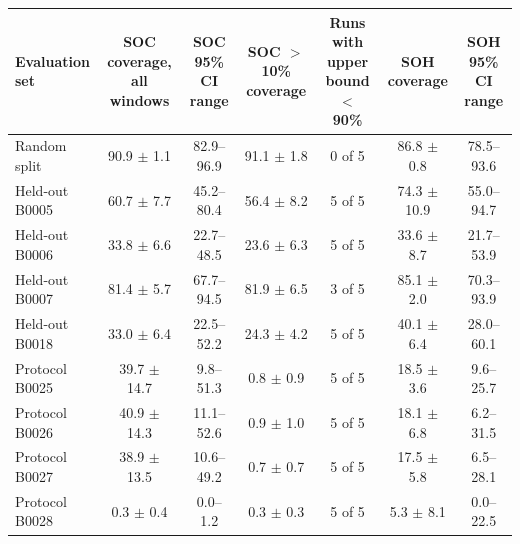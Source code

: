 \begin{tabular}{lcccccc}
\toprule
Evaluation set & SOC coverage, all windows & SOC 95\% CI range & SOC $>$ 10\% coverage & Runs with upper bound $<$ 90\% & SOH coverage & SOH 95\% CI range \\
\midrule
Random split & 90.9 $\pm$ 1.1 & 82.9--96.9 & 91.1 $\pm$ 1.8 & 0 of 5 & 86.8 $\pm$ 0.8 & 78.5--93.6 \\
\midrule
Held-out B0005 & 60.7 $\pm$ 7.7 & 45.2--80.4 & 56.4 $\pm$ 8.2 & 5 of 5 & 74.3 $\pm$ 10.9 & 55.0--94.7 \\
Held-out B0006 & 33.8 $\pm$ 6.6 & 22.7--48.5 & 23.6 $\pm$ 6.3 & 5 of 5 & 33.6 $\pm$ 8.7 & 21.7--53.9 \\
Held-out B0007 & 81.4 $\pm$ 5.7 & 67.7--94.5 & 81.9 $\pm$ 6.5 & 3 of 5 & 85.1 $\pm$ 2.0 & 70.3--93.9 \\
Held-out B0018 & 33.0 $\pm$ 6.4 & 22.5--52.2 & 24.3 $\pm$ 4.2 & 5 of 5 & 40.1 $\pm$ 6.4 & 28.0--60.1 \\
\midrule
Protocol B0025 & 39.7 $\pm$ 14.7 & 9.8--51.3 & 0.8 $\pm$ 0.9 & 5 of 5 & 18.5 $\pm$ 3.6 & 9.6--25.7 \\
Protocol B0026 & 40.9 $\pm$ 14.3 & 11.1--52.6 & 0.9 $\pm$ 1.0 & 5 of 5 & 18.1 $\pm$ 6.8 & 6.2--31.5 \\
Protocol B0027 & 38.9 $\pm$ 13.5 & 10.6--49.2 & 0.7 $\pm$ 0.7 & 5 of 5 & 17.5 $\pm$ 5.8 & 6.5--28.1 \\
Protocol B0028 & 0.3 $\pm$ 0.4 & 0.0--1.2 & 0.3 $\pm$ 0.3 & 5 of 5 & 5.3 $\pm$ 8.1 & 0.0--22.5 \\
\bottomrule
\end{tabular}
